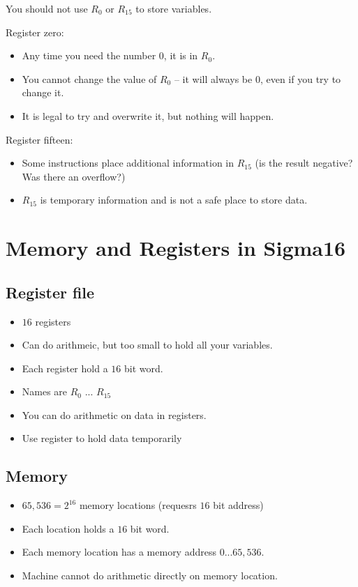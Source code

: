 You should not use \(R_0\) or \(R_{15}\) to store variables.

Register zero:
\begin{itemize}
	\item Any time you need the number \(0\), it is in \(R_0\).
	\item You cannot change the value of \(R_0\) -- it will always  be \(0\), even if you try to change it.
	\item It is legal to try and overwrite it, but nothing will happen.
\end{itemize}
%
Register fifteen:
\begin{itemize}
	\item Some instructions place additional information in \(R_{15}\) (is the result negative? Was there an overflow?)
	\item \(R_{15}\) is temporary information and is not a safe place to store data.
\end{itemize}

\section{Memory and Registers in Sigma16}\label{sec:memory_and_registers_in_sigma16}

\subsection{Register file}\label{sub:register_file}

\begin{itemize}
	\item \(16\) registers
	\item Can do arithmeic, but too small to hold all your variables.
	\item Each register hold a \(16\) bit word.
	\item Names are \(R_0\) ...  \(R_{15}\)
	\item You can do arithmetic on data in registers.
	\item Use register to hold data temporarily
\end{itemize}

\subsection{Memory}\label{sub:memory}

\begin{itemize}
	\item \(65,536 = 2^{16}\) memory locations (requesrs \(16\) bit address)
	\item Each location holds a \(16\) bit word.
	\item Each memory location has a memory address \(0\)...\(65,536\).
	\item Machine cannot do arithmetic directly on memory location.
\end{itemize}


